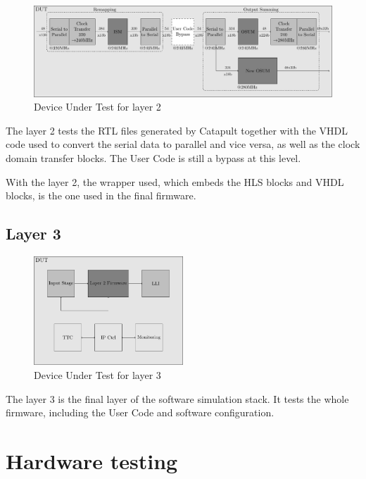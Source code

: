 \begin{figure}[htb]
    \centering
    \includegraphics[width=1\textwidth]{diagrams/l2}
    \caption{Device Under Test for layer 2}
    \label{fig:dut-l2}
\end{figure}

The layer 2 tests the RTL files generated by Catapult together with the VHDL code used to convert the serial data to parallel and vice versa, as well as the clock domain transfer blocks. The User Code is still a bypass at this level. 

With the layer 2, the wrapper used, which embeds the HLS blocks and VHDL blocks, is the one used in the final firmware.

\subsection{Layer 3}

\begin{figure}[htb]
    \centering
    \includegraphics[width=0.5\textwidth]{diagrams/l3}
    \caption{Device Under Test for layer 3}
    \label{fig:dut-l3}
\end{figure}

The layer 3 is the final layer of the software simulation stack. It tests the whole firmware, including the User Code and software configuration.

\section{Hardware testing}
